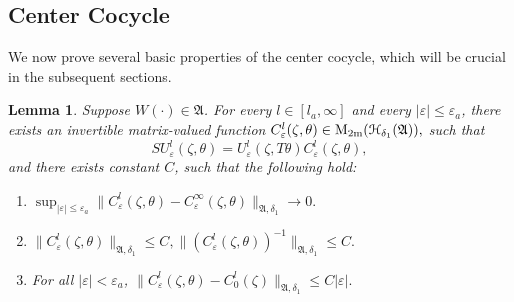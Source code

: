 \documentclass[reqno,11pt]{amsart}
\newtheorem{lemma}{Lemma}[section]
\begin{document}
\subsection{Center Cocycle}
We now prove several basic properties of the center cocycle, which will be crucial in the subsequent sections.

\begin{lemma}
    \label{thm:center}
  Suppose $W(\cdot)\in \mathfrak A$. For every $l\in[ l_a,\infty]$ and every
$|\varepsilon|\le \varepsilon_{a}$, 
there exists an invertible  matrix-valued function
$
C_\varepsilon^l(\zeta,\theta)\in \rm M_{2m}(\mathcal H_{\delta_1}(\mathfrak A))  ,
$
such that
\begin{equation}\label{shift}
SU_\varepsilon^l(\zeta,\theta)
=U_\varepsilon^l(\zeta,T\theta)C_\varepsilon^l(\zeta,\theta),
\end{equation}
and there exists  constant $C$, such that the following hold: 

\begin{enumerate}
\item  $\sup_{|\varepsilon|\leq \varepsilon_a}\|C_{\varepsilon}^{l}(\zeta,\theta)-C_{\varepsilon}^{\infty}(\zeta,\theta)\|_{\mathfrak A,\delta_{1}}\to 0.$

\item
$
\|C_\varepsilon^l(\zeta,\theta)\|_{\mathfrak A,\delta_{1}}\le C,
\|(C_\varepsilon^l(\zeta,\theta))^{-1}\|_{\mathfrak A,\delta_{1}}\le C.
$

\item
 For all $|\varepsilon|<\varepsilon_a$,
$
\|C_\varepsilon^l(\zeta,\theta)-C_0^l(\zeta)\|_{\mathfrak A,\delta_{1}}
\le C|\varepsilon|.
$
\end{enumerate}
\end{lemma}
\end{document}
